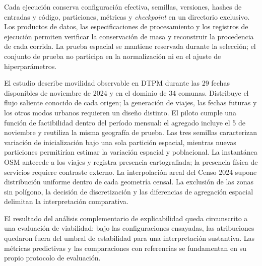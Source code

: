 Cada ejecución conserva configuración efectiva, semillas, versiones, hashes de entradas y código, particiones, métricas y \textit{checkpoint} en un directorio exclusivo. Los productos de datos, las especificaciones de procesamiento y los registros de ejecución permiten verificar la conservación de masa y reconstruir la procedencia de cada corrida. La prueba espacial se mantiene reservada durante la selección; el conjunto de prueba no participa en la normalización ni en el ajuste de hiperparámetros.

El estudio describe movilidad observable en DTPM durante las 29 fechas disponibles de noviembre de 2024 y en el dominio de 34 comunas. Distribuye el flujo saliente conocido de cada origen; la generación de viajes, las fechas futuras y los otros modos urbanos requieren un diseño distinto. El piloto cumple una función de factibilidad dentro del período mensual: el agregado incluye el 5 de noviembre y reutiliza la misma geografía de prueba. Las tres semillas caracterizan variación de inicialización bajo una sola partición espacial, mientras nuevas particiones permitirían estimar la variación espacial y poblacional. La instantánea OSM antecede a los viajes y registra presencia cartografiada; la presencia física de servicios requiere contraste externo. La interpolación areal del Censo 2024 supone distribución uniforme dentro de cada geometría censal. La exclusión de las zonas sin polígono, la decisión de discretización y las diferencias de agregación espacial delimitan la interpretación comparativa.

El resultado del análisis complementario de explicabilidad queda circunscrito a una evaluación de viabilidad: bajo las configuraciones ensayadas, las atribuciones quedaron fuera del umbral de estabilidad para una interpretación sustantiva. Las métricas predictivas y las comparaciones con referencias se fundamentan en su propio protocolo de evaluación.
